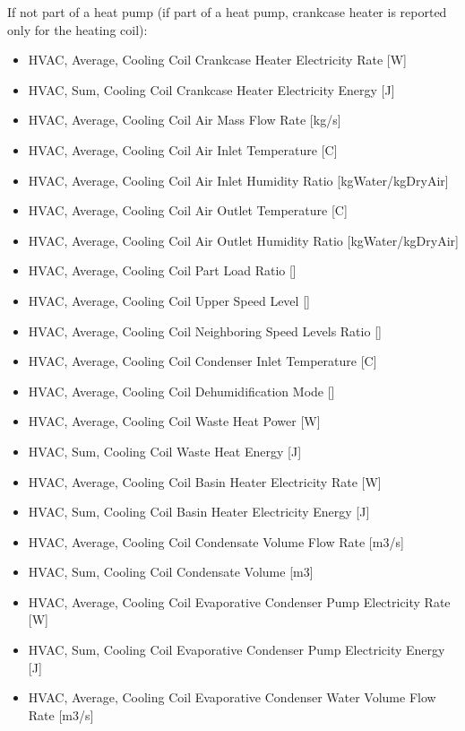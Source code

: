 If not part of a heat pump (if part of a heat pump, crankcase heater is reported only for the heating coil):

\begin{itemize}
\item HVAC, Average, Cooling Coil Crankcase Heater Electricity Rate {[}W{]}
\item HVAC, Sum, Cooling Coil Crankcase Heater Electricity Energy {[}J{]}
\end{itemize}

\begin{itemize}
\item HVAC, Average, Cooling Coil Air Mass Flow Rate {[}kg/s{]}
\item HVAC, Average, Cooling Coil Air Inlet Temperature {[}C{]}
\item HVAC, Average, Cooling Coil Air Inlet Humidity Ratio {[}kgWater/kgDryAir{]}
\item HVAC, Average, Cooling Coil Air Outlet Temperature {[}C{]}
\item HVAC, Average, Cooling Coil Air Outlet Humidity Ratio {[}kgWater/kgDryAir{]}
\item HVAC, Average, Cooling Coil Part Load Ratio {[]}
\item HVAC, Average, Cooling Coil Upper Speed Level {[]}
\item HVAC, Average, Cooling Coil Neighboring Speed Levels Ratio {[]}
\item HVAC, Average, Cooling Coil Condenser Inlet Temperature {[}C{]}
\item HVAC, Average, Cooling Coil Dehumidification Mode {[]}
\item HVAC, Average, Cooling Coil Waste Heat Power {[}W{]}
\item HVAC, Sum, Cooling Coil Waste Heat Energy {[}J{]}
\item HVAC, Average, Cooling Coil Basin Heater Electricity Rate {[}W{]}
\item HVAC, Sum, Cooling Coil Basin Heater Electricity Energy {[}J{]}
\item HVAC, Average, Cooling Coil Condensate Volume Flow Rate {[}m3/s{]}
\item HVAC, Sum, Cooling Coil Condensate Volume {[}m3{]}
\item HVAC, Average, Cooling Coil Evaporative Condenser Pump Electricity Rate {[}W{]}
\item HVAC, Sum, Cooling Coil Evaporative Condenser Pump Electricity Energy {[}J{]}
\item HVAC, Average, Cooling Coil Evaporative Condenser Water Volume Flow Rate {[}m3/s{]}

\end{itemize}
